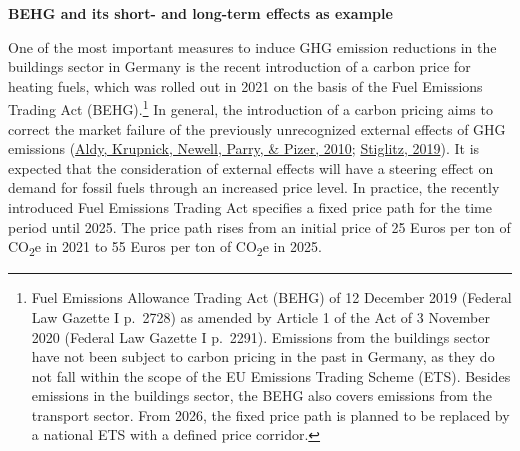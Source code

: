 \documentclass[12pt,twoside]{reedthesis}
\begin{document}
\textbf{BEHG and its short- and long-term effects as example}

One of the most important measures to induce GHG emission reductions in the buildings sector in Germany is the recent introduction of a carbon price for heating fuels, which was rolled out in 2021 on the basis of the Fuel Emissions Trading Act (BEHG).\footnote{Fuel Emissions Allowance Trading Act (BEHG) of 12 December 2019 (Federal Law Gazette I p.~2728) as amended by Article 1 of the Act of 3 November 2020 (Federal Law Gazette I p.~2291). Emissions from the buildings sector have not been subject to carbon pricing in the past in Germany, as they do not fall within the scope of the EU Emissions Trading Scheme (ETS). Besides emissions in the buildings sector, the BEHG also covers emissions from the transport sector. From 2026, the fixed price path is planned to be replaced by a national ETS with a defined price corridor.} In general, the introduction of a carbon pricing aims to correct the market failure of the previously unrecognized external effects of GHG emissions (\protect\hyperlink{ref-aldy_etal10}{Aldy, Krupnick, Newell, Parry, \& Pizer, 2010}; \protect\hyperlink{ref-stiglitz19}{Stiglitz, 2019}). It is expected that the consideration of external effects will have a steering effect on demand for fossil fuels through an increased price level. In practice, the recently introduced Fuel Emissions Trading Act specifies a fixed price path for the time period until 2025. The price path rises from an initial price of 25 Euros per ton of CO\textsubscript{2}e in 2021 to 55 Euros per ton of CO\textsubscript{2}e in 2025.
\end{document}
